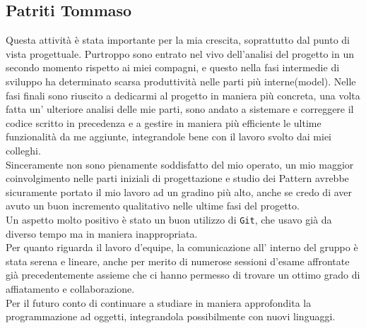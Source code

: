 \documentclass[a4paper,12pt]{report}
\begin{document}
\subsection{Patriti Tommaso}
Questa attività è stata importante per la mia crescita, soprattutto dal punto di vista progettuale. Purtroppo sono entrato nel vivo dell'analisi del progetto in un secondo momento rispetto ai miei compagni, e questo nella fasi intermedie di sviluppo ha determinato scarsa produttività  nelle parti più interne(model). Nelle fasi finali sono riuscito a dedicarmi al progetto in maniera più concreta, una volta fatta un' ulteriore analisi delle mie parti, sono andato a sistemare e correggere il codice scritto in precedenza e a gestire in maniera più efficiente le ultime funzionalità da me aggiunte, integrandole bene con il lavoro svolto dai miei colleghi.
\\
Sinceramente non sono pienamente soddisfatto del mio operato, un mio maggior coinvolgimento nelle parti iniziali di progettazione e studio dei Pattern avrebbe sicuramente portato il mio lavoro ad un gradino più alto, anche se credo di aver avuto un buon incremento qualitativo nelle ultime fasi del progetto.
\\
Un aspetto molto positivo è stato un buon utilizzo di \texttt{Git}, che usavo già da diverso tempo ma in maniera inappropriata.
\\
Per quanto riguarda il lavoro d’equipe, la comunicazione all’ interno del gruppo è stata serena e lineare, anche per merito di numerose sessioni d'esame affrontate già precedentemente assieme che ci hanno permesso di trovare un ottimo grado di affiatamento e collaborazione.
\\
Per il futuro conto di continuare a studiare in maniera approfondita la programmazione ad oggetti, integrandola possibilmente con nuovi linguaggi.
\end{document}
